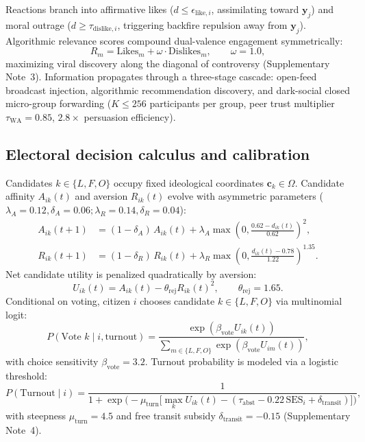 \documentclass[11pt,a4paper]{article}
\begin{document}
Reactions branch into affirmative likes ($d \le \epsilon_{\mathrm{like}, i}$, assimilating toward $\mathbf{y}_j$) and moral outrage ($d \ge \tau_{\mathrm{dislike}, i}$, triggering backfire repulsion away from $\mathbf{y}_j$). Algorithmic relevance scores compound dual-valence engagement symmetrically:
\begin{equation}
    R_m = \mathrm{Likes}_m + \omega \cdot \mathrm{Dislikes}_m, \qquad \omega = 1.0,
    \label{eq:methods_relevance}
\end{equation}
maximizing viral discovery along the diagonal of controversy (Supplementary Note~3). Information propagates through a three-stage cascade: open-feed broadcast injection, algorithmic recommendation discovery, and dark-social closed micro-group forwarding ($K \le 256$ participants per group, peer trust multiplier $\tau_{\text{WA}} = 0.85$, $2.8\times$ persuasion efficiency).

\subsection*{Electoral decision calculus and calibration}
Candidates $k \in \{L, F, O\}$ occupy fixed ideological coordinates $\mathbf{c}_k \in \Omega$. Candidate affinity $A_{ik}(t)$ and aversion $R_{ik}(t)$ evolve with asymmetric parameters ($\lambda_A = 0.12, \delta_A = 0.06; \lambda_R = 0.14, \delta_R = 0.04$):
\begin{align}
    A_{ik}(t+1) &= (1 - \delta_A)\,A_{ik}(t) + \lambda_A \max\!\left(0, \frac{0.62 - d_{ik}(t)}{0.62}\right)^2, \label{eq:methods_adm} \\
    R_{ik}(t+1) &= (1 - \delta_R)\,R_{ik}(t) + \lambda_R \max\!\left(0, \frac{d_{ik}(t) - 0.78}{1.22}\right)^{1.35}. \label{eq:methods_rej}
\end{align}
Net candidate utility is penalized quadratically by aversion:
\begin{equation}
    U_{ik}(t) = A_{ik}(t) - \theta_{\mathrm{rej}} R_{ik}(t)^2, \qquad \theta_{\mathrm{rej}} = 1.65.
    \label{eq:methods_utility}
\end{equation}
Conditional on voting, citizen $i$ chooses candidate $k \in \{L, F, O\}$ via multinomial logit:
\begin{equation}
    P(\text{Vote } k \mid i, \text{turnout}) = \frac{\exp(\beta_{\mathrm{vote}} U_{ik}(t))}{\sum_{m \in \{L, F, O\}} \exp(\beta_{\mathrm{vote}} U_{im}(t))},
    \label{eq:methods_logit}
\end{equation}
with choice sensitivity $\beta_{\mathrm{vote}} = 3.2$. Turnout probability is modeled via a logistic threshold:
\begin{equation}
    P(\text{Turnout} \mid i) = \frac{1}{1 + \exp\!\big(-\mu_{\mathrm{turn}}\big[\max_k U_{ik}(t) - (\tau_{\mathrm{abst}} - 0.22\,\mathrm{SES}_i + \delta_{\mathrm{transit}})\big]\big)},
    \label{eq:methods_turnout}
\end{equation}
with steepness $\mu_{\mathrm{turn}} = 4.5$ and free transit subsidy $\delta_{\mathrm{transit}} = -0.15$ (Supplementary Note~4).
\end{document}
